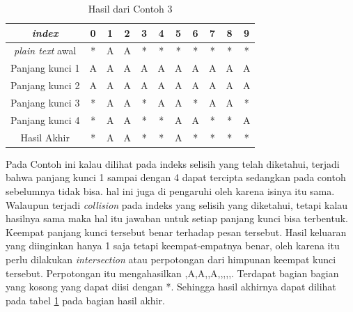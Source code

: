 	\begin{table}[H]
		\centering
		\begin{tabular}{|c|c|c|c|c|c|c|c|c|c|c|}\hline
		\textit{index}&0&1&2&3&4&5&6&7&8&9\\ \hline	
		\textit{plain text} awal&*&A&A&*&*&*&*&*&*&*\\ \hline
		Panjang kunci 1 &A&A&A&A&A&A&A&A&A&A\\ \hline
		Panjang kunci 2 &A&A&A&A&A&A&A&A&A&A\\ \hline
		Panjang kunci 3 &*&A&A&*&A&A&*&A&A&*\\ \hline
		Panjang kunci 4 &*&A&A&*&*&A&A&*&*&A\\ \hline
		Hasil Akhir     &*&A&A&*&*&A&*&*&*&*\\ \hline
		\end{tabular}
		\caption{Hasil dari Contoh 3}
		\label{tab:res_contoh_3}
	\end{table}
	Pada Contoh ini kalau dilihat pada indeks selisih yang telah diketahui, terjadi bahwa panjang kunci 1 sampai dengan 4 dapat tercipta sedangkan pada contoh sebelumnya tidak bisa. hal ini juga di pengaruhi oleh karena isinya itu sama. Walaupun terjadi \textit{collision} pada indeks yang selisih yang diketahui, tetapi kalau hasilnya sama maka hal itu jawaban untuk setiap panjang kunci bisa terbentuk. Keempat panjang kunci tersebut benar terhadap pesan tersebut. Hasil keluaran yang diinginkan hanya 1 saja tetapi keempat-empatnya benar, oleh karena itu perlu dilakukan \textit{intersection} atau perpotongan dari himpunan keempat kunci tersebut. Perpotongan itu mengahasilkan {,A,A,,A,,,,,}. Terdapat bagian bagian yang kosong yang dapat  diisi dengan *. Sehingga hasil akhirnya dapat dilihat pada tabel \ref{tab:res_contoh_3} pada bagian hasil akhir.
	
